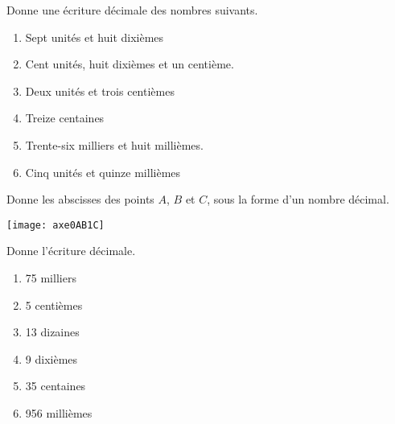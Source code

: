 \begin{exercice}
Donne une écriture décimale des nombres suivants.
\begin{enumerate}
 \item Sept unités et huit dixièmes \dotfill
 \item Cent unités, huit dixièmes et un centième.
 \dotfill
 \item Deux unités et trois centièmes
 
 \dotfill
 \item Treize centaines \dotfill
 \item Trente-six milliers et huit millièmes.
 
 \dotfill
 \item Cinq unités et quinze millièmes \dotfill
 \end{enumerate}
\end{exercice}


\begin{exercice}
Donne les abscisses des points $A$, $B$ et $C$, sous la forme d'un nombre décimal.
\begin{center} \texttt{[image: axe0AB1C]} \end{center}
\end{exercice}

\begin{exercice}
Donne l'écriture décimale.
\begin{enumerate} 
 \item 75 milliers \dotfill \hspace*{11em}

 \item 5 centièmes \dotfill \hspace*{11em}

 \item 13 dizaines \dotfill \hspace*{11em}

 \item 9 dixièmes \dotfill \hspace*{11em}

 \item 35 centaines \dotfill \hspace*{11em}

 \item 956 millièmes \dotfill \hspace*{11em}

 \end{enumerate}
\end{exercice}


